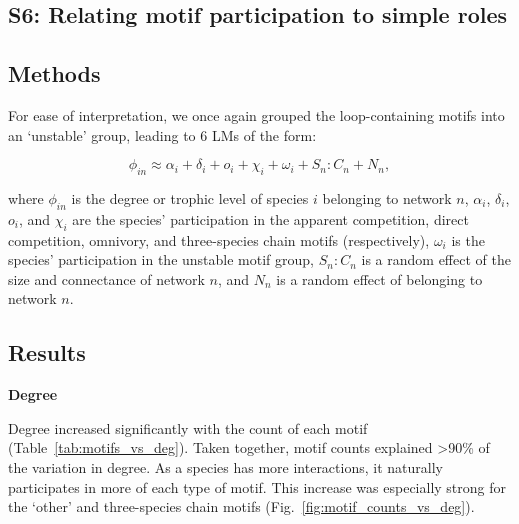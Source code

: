 \documentclass[12pt]{article}
\begin{document}
\begin{spacing}{2.0}
\clearpage


\section*{S6: Relating motif participation to simple roles}

	\subsection*{Methods}

        For ease of interpretation, we once again grouped the loop-containing motifs into an `unstable' group, leading to 6 LMs of the form:

        \begin{equation}
            \phi_{in} \approx \alpha_{i} + \delta_{i} + o_{i} + \chi_{i} + \omega_{i} + S_{n}:C_{n} + N_n,
            \label{eq:degTL_motifs}
        \end{equation}

        where $\phi_{in}$ is the degree or trophic level of species $i$ belonging to network $n$, $\alpha_{i}$, $\delta_{i}$, $o_{i}$, and $\chi_{i}$ are the species' participation in the apparent competition, direct competition, omnivory, and three-species chain motifs (respectively), $\omega_{i}$ is the species' participation in the unstable motif group, $S_{n}:C_{n}$ is a random effect of the size and connectance of network $n$, and $N_n$ is a random effect of belonging to network $n$.

	\subsection*{Results}

		\textbf{Degree}

			Degree increased significantly with the count of each motif (Table~\ref{tab:motifs_vs_deg}).
			Taken together, motif counts explained \textgreater90\% of the variation in degree. 
			As a species has more interactions, it naturally participates in more of each type of motif.
			This increase was especially strong for the `other' and three-species chain motifs (Fig.~\ref{fig:motif_counts_vs_deg}).



\end{spacing}
\end{document}
